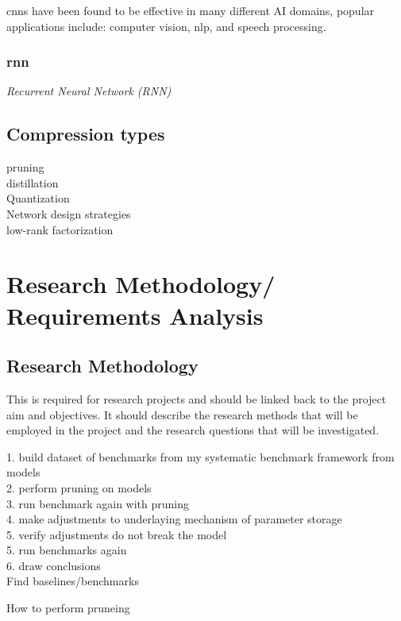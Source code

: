 \documentclass[11pt]{article}
\begin{document}
\acrshort{cnn}s have been found to be effective in many different AI domains, popular applications include: computer vision, \Acrshort{nlp}, and speech processing. 

\subsubsection{\Acrlong*{rnn}}
\emph{
    Recurrent Neural Network (RNN)\\
}




\subsection{Compression types}\label{subsec:compressionTypes}
pruning\\
distillation\\
Quantization\\
Network design strategies\\
low-rank factorization\\

\pagebreak
\section{Research Methodology/ Requirements Analysis}
\subsection{Research Methodology}
This is required for research projects and should be linked
back to the project aim and objectives. It should describe the research methods that
will be employed in the project and the research questions that will be investigated.


1. build dataset of benchmarks from my systematic benchmark framework from models\\
2. perform pruning on models\\
3. run benchmark again with pruning\\
4. make adjustments to underlaying mechanism of parameter storage\\
5. verify adjustments do not break the model\\
5. run benchmarks again\\
6. draw conclusions\\

Find baselines/benchmarks

How to perform pruneing
\end{document}

